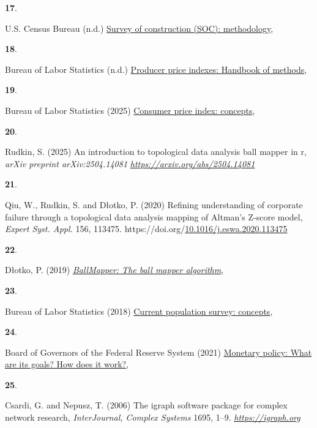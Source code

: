 \documentclass[
  10pt,
  letterpaper,
  DIV=11,
  numbers=noendperiod]{scrartcl}
\newlength{\cslhangindent}
\newlength{\csllabelwidth}
\newenvironment{CSLReferences}[2] %
 {\begin{list}{}{%
  \setlength{\itemindent}{0pt}
  \setlength{\leftmargin}{0pt}
  \setlength{\parsep}{0pt}
  \ifodd #1
   \setlength{\leftmargin}{\cslhangindent}
   \setlength{\itemindent}{-1\cslhangindent}
  \fi
  \setlength{\itemsep}{#2\baselineskip}}}
 {\end{list}}
\newcommand{\CSLLeftMargin}[1]{\parbox[t]{\csllabelwidth}{\strut#1\strut}}
\newcommand{\CSLRightInline}[1]{\parbox[t]{\linewidth - \csllabelwidth}{\strut#1\strut}}
\begin{document}
\begin{CSLReferences}{1}{0}
\CSLLeftMargin{\textbf{17}. }%
\CSLRightInline{U.S. Census Bureau (n.d.)
\href{https://www.census.gov/construction/soc/methodology.html}{Survey
of construction (SOC): methodology}, }

\CSLLeftMargin{\textbf{18}. }%
\CSLRightInline{Bureau of Labor Statistics (n.d.)
\href{https://www.bls.gov/opub/hom/ppi/home.htm}{Producer price indexes:
Handbook of methods}, }

\CSLLeftMargin{\textbf{19}. }%
\CSLRightInline{Bureau of Labor Statistics (2025)
\href{https://www.bls.gov/opub/hom/cpi/concepts.htm}{Consumer price
index: concepts}, }

\CSLLeftMargin{\textbf{20}. }%
\CSLRightInline{Rudkin, S. (2025) An introduction to topological data
analysis ball mapper in r, \emph{arXiv preprint arXiv:2504.14081}
\emph{\url{https://arxiv.org/abs/2504.14081}}}

\CSLLeftMargin{\textbf{21}. }%
\CSLRightInline{Qiu, W., Rudkin, S. and Dłotko, P. (2020) Refining
understanding of corporate failure through a topological data analysis
mapping of {A}ltman's {Z}-score model, \emph{Expert Syst. Appl.} 156,
113475.
https://doi.org/\href{https://doi.org/10.1016/j.eswa.2020.113475}{10.1016/j.eswa.2020.113475}}

\CSLLeftMargin{\textbf{22}. }%
\CSLRightInline{Dłotko, P. (2019)
\emph{\href{https://CRAN.R-project.org/package=BallMapper}{BallMapper:
The ball mapper algorithm}}, }

\CSLLeftMargin{\textbf{23}. }%
\CSLRightInline{Bureau of Labor Statistics (2018)
\href{https://www.bls.gov/opub/hom/cps/concepts.htm}{Current population
survey: concepts}, }

\CSLLeftMargin{\textbf{24}. }%
\CSLRightInline{Board of Governors of the Federal Reserve System (2021)
\href{https://www.federalreserve.gov/monetarypolicy/monetary-policy-what-are-its-goals-how-does-it-work.htm}{Monetary
policy: What are its goals? How does it work?}, }

\CSLLeftMargin{\textbf{25}. }%
\CSLRightInline{Csardi, G. and Nepusz, T. (2006) The igraph software
package for complex network research, \emph{InterJournal, Complex
Systems} 1695, 1--9. \emph{\url{https://igraph.org}}}


\end{CSLReferences}
\end{document}
